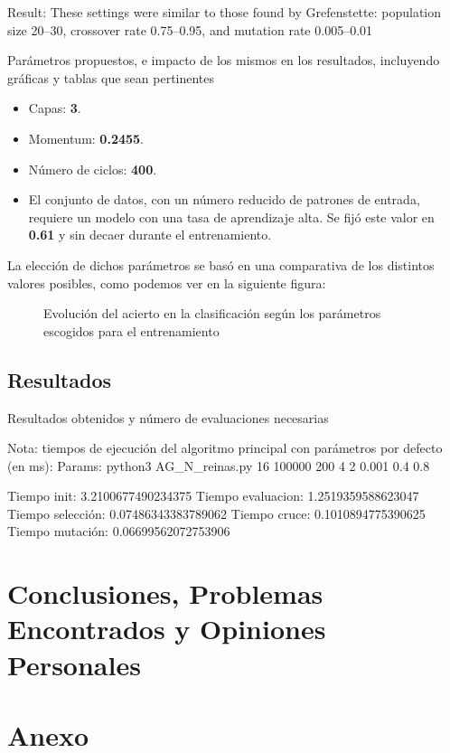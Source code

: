 \documentclass[12pt]{article}
\begin{document}
Result: These settings were similar to those found by Grefenstette: population size 20–30, crossover rate 0.75–0.95, and mutation rate 0.005–0.01

Parámetros propuestos, e impacto de los mismos en los 
resultados, incluyendo 
gráficas y 
tablas que sean pertinentes

\begin{itemize}
    \setlength\itemsep{0em}
    \item Capas: \textbf{3}.
    \item Momentum: \textbf{0.2455}.
    \item Número de ciclos: \textbf{400}.
    \item El conjunto de datos, con un número reducido de patrones de
    entrada, requiere un modelo con una tasa de aprendizaje alta. Se fijó este
    valor en \textbf{0.61} y sin decaer durante el entrenamiento.
\end{itemize}

La elección de dichos parámetros se basó en una comparativa de los distintos
valores posibles, como podemos ver en la siguiente figura:

\begin{figure}[h]
    \center
    \caption{Evolución del acierto en la clasificación según los parámetros escogidos para el entrenamiento}
    \label{}
\end{figure}

\subsection{Resultados}

Resultados obtenidos y 
número de evaluaciones
necesarias

Nota: tiempos de ejecución del algoritmo principal con parámetros por defecto (en ms):
Params: python3 AG_N_reinas.py 16 100000 200 4 2 0.001 0.4 0.8

Tiempo init:  3.2100677490234375
Tiempo evaluacion:  1.2519359588623047
Tiempo selección:  0.07486343383789062
Tiempo cruce:  0.1010894775390625
Tiempo mutación:  0.06699562072753906


\newpage


\newpage

\section{Conclusiones, Problemas Encontrados y Opiniones Personales}

\section{Anexo}



\end{document}
